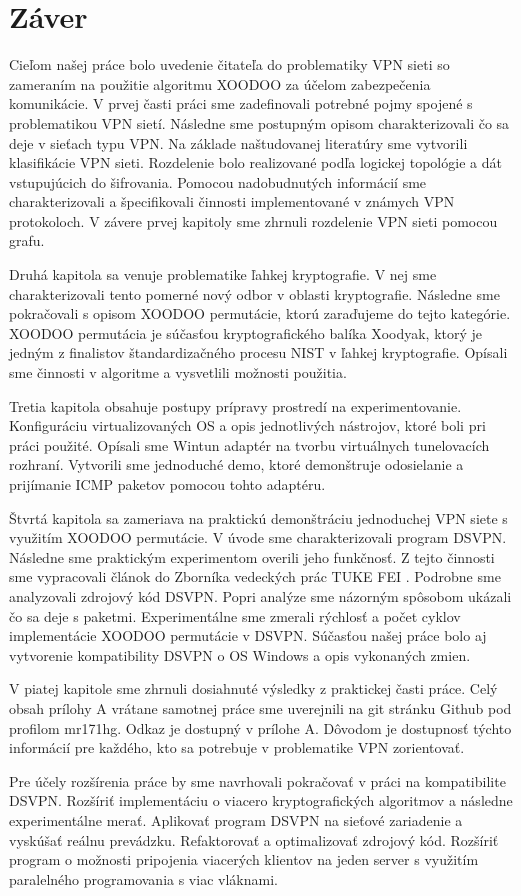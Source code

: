
\chapter{Záver}
\label{summary}
Cieľom našej práce bolo uvedenie čitateľa do problematiky VPN sieti so zameraním na použitie algoritmu XOODOO za účelom zabezpečenia komunikácie. V prvej časti práci sme zadefinovali potrebné pojmy spojené s problematikou VPN sietí. Následne sme postupným opisom charakterizovali čo sa deje v sieťach typu VPN. Na základe naštudovanej literatúry sme vytvorili klasifikácie VPN sieti. Rozdelenie bolo realizované podľa logickej topológie a dát vstupujúcich do šifrovania. Pomocou nadobudnutých informácií sme charakterizovali a špecifikovali činnosti implementované v známych VPN protokoloch. V závere prvej kapitoly sme zhrnuli rozdelenie VPN sieti pomocou grafu.

Druhá kapitola sa venuje problematike ľahkej kryptografie. V nej sme charakterizovali tento pomerné nový odbor v oblasti kryptografie. Následne sme pokračovali s opisom XOODOO permutácie, ktorú zaraďujeme do tejto kategórie. XOODOO permutácia je súčasťou kryptografického balíka Xoodyak, ktorý je jedným z finalistov štandardizačného procesu NIST v ľahkej kryptografie. Opísali sme činnosti v algoritme a vysvetlili možnosti použitia. 

Tretia kapitola obsahuje postupy prípravy prostredí na experimentovanie. Konfiguráciu virtualizovaných OS a opis jednotlivých nástrojov, ktoré boli pri práci použité. Opísali sme Wintun adaptér na tvorbu virtuálnych tunelovacích rozhraní. Vytvorili sme jednoduché demo, ktoré demonštruje odosielanie a prijímanie ICMP paketov pomocou tohto adaptéru.

Štvrtá kapitola sa zameriava na praktickú demonštráciu jednoduchej VPN siete s využitím XOODOO permutácie. V úvode sme charakterizovali program DSVPN. Následne sme praktickým experimentom overili jeho funkčnosť. Z tejto činnosti sme vypracovali článok do Zborníka vedeckých prác TUKE FEI \cite{clanok}. Podrobne sme analyzovali zdrojový kód DSVPN. Popri analýze sme názorným spôsobom ukázali čo sa deje s paketmi. Experimentálne sme zmerali rýchlosť a počet cyklov implementácie XOODOO permutácie v DSVPN. Súčasťou našej práce bolo aj vytvorenie kompatibility DSVPN o OS Windows a opis vykonaných zmien. 

V piatej kapitole sme zhrnuli dosiahnuté výsledky z praktickej časti práce. Celý obsah prílohy A vrátane samotnej práce sme uverejnili na git stránku Github pod profilom mr171hg. Odkaz je dostupný v prílohe A. Dôvodom je dostupnosť týchto informácií pre každého, kto sa potrebuje v problematike VPN zorientovať.  

Pre účely rozšírenia práce by sme navrhovali pokračovať v práci na kompatibilite DSVPN. Rozšíriť implementáciu o viacero kryptografických algoritmov a následne experimentálne merať. Aplikovať program DSVPN na sieťové zariadenie a vyskúšať reálnu prevádzku. Refaktorovať a optimalizovať zdrojový kód. Rozšíriť program o možnosti pripojenia viacerých klientov na jeden server s využitím paralelného programovania s viac vláknami. 
